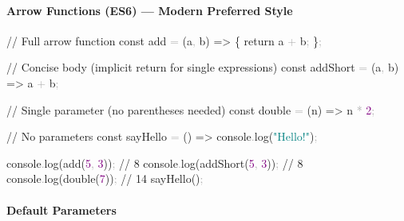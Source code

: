 \documentclass[
  justified,
  openright,
]{tufte-book}
\let\subsubsection\paragraph
\let\paragraph\paragraph
\newcommand{\BuiltInTok}[1]{#1}
\newcommand{\CommentTok}[1]{\textcolor{MidGray}{#1}}
\newcommand{\ControlFlowTok}[1]{\textcolor{BrandBlue}{#1}}
\newcommand{\DecValTok}[1]{\textcolor{Purple}{#1}}
\newcommand{\FunctionTok}[1]{\textcolor{BrandBlue}{#1}}
\newcommand{\KeywordTok}[1]{\textcolor{BrandBlue}{#1}}
\newcommand{\NormalTok}[1]{#1}
\newcommand{\OperatorTok}[1]{\textcolor{DarkGray}{#1}}
\newcommand{\StringTok}[1]{\textcolor{Teal}{#1}}
\newenvironment{Shaded}{%
  \begin{snugshade}
}{%
  \end{snugshade}
}
\let\subsubsection\paragraph
\let\paragraph\paragraph
\begin{document}
\subsubsection{Arrow Functions (ES6) --- Modern Preferred
Style}\label{arrow-functions-es6-modern-preferred-style}

\begin{Shaded}
\begin{Highlighting}[]
\CommentTok{// Full arrow function}
\KeywordTok{const}\NormalTok{ add }\OperatorTok{=}\NormalTok{ (a}\OperatorTok{,}\NormalTok{ b) }\KeywordTok{=\textgreater{}}\NormalTok{ \{}
  \ControlFlowTok{return}\NormalTok{ a }\OperatorTok{+}\NormalTok{ b}\OperatorTok{;}
\NormalTok{\}}\OperatorTok{;}

\CommentTok{// Concise body (implicit return for single expressions)}
\KeywordTok{const}\NormalTok{ addShort }\OperatorTok{=}\NormalTok{ (a}\OperatorTok{,}\NormalTok{ b) }\KeywordTok{=\textgreater{}}\NormalTok{ a }\OperatorTok{+}\NormalTok{ b}\OperatorTok{;}

\CommentTok{// Single parameter (no parentheses needed)}
\KeywordTok{const}\NormalTok{ double }\OperatorTok{=}\NormalTok{ (n) }\KeywordTok{=\textgreater{}}\NormalTok{ n }\OperatorTok{*} \DecValTok{2}\OperatorTok{;}

\CommentTok{// No parameters}
\KeywordTok{const}\NormalTok{ sayHello }\OperatorTok{=}\NormalTok{ () }\KeywordTok{=\textgreater{}} \BuiltInTok{console}\OperatorTok{.}\FunctionTok{log}\NormalTok{(}\StringTok{"Hello!"}\NormalTok{)}\OperatorTok{;}

\BuiltInTok{console}\OperatorTok{.}\FunctionTok{log}\NormalTok{(}\FunctionTok{add}\NormalTok{(}\DecValTok{5}\OperatorTok{,} \DecValTok{3}\NormalTok{))}\OperatorTok{;} \CommentTok{// 8}
\BuiltInTok{console}\OperatorTok{.}\FunctionTok{log}\NormalTok{(}\FunctionTok{addShort}\NormalTok{(}\DecValTok{5}\OperatorTok{,} \DecValTok{3}\NormalTok{))}\OperatorTok{;} \CommentTok{// 8}
\BuiltInTok{console}\OperatorTok{.}\FunctionTok{log}\NormalTok{(}\FunctionTok{double}\NormalTok{(}\DecValTok{7}\NormalTok{))}\OperatorTok{;} \CommentTok{// 14}
\FunctionTok{sayHello}\NormalTok{()}\OperatorTok{;}
\end{Highlighting}
\end{Shaded}

\subsubsection{Default Parameters}\label{default-parameters}
\end{document}
